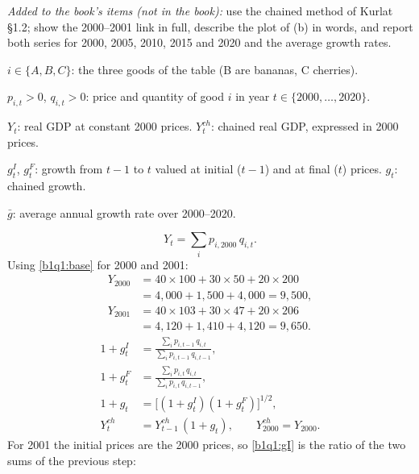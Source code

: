 \noindent\textit{Added to the book's items (not in the book):} use the chained method of Kurlat \S1.2; show the 2000--2001 link in full,
describe the plot of (b) in words, and report both series for 2000, 2005, 2010, 2015 and 2020 and the average growth rates.
\resolespaco
\begin{sol}
\begin{notacao}
\item $i\in\{A,B,C\}$: the three goods of the table (B are bananas, C cherries).
\item $p_{i,t}>0$, $q_{i,t}>0$: price and quantity of good $i$ in year $t\in\{2000,\dots,2020\}$.
\item $Y_t$: real GDP at constant 2000 prices. $Y^{ch}_t$: chained real GDP, expressed in 2000 prices.
\item $g^I_t$, $g^F_t$: growth from $t-1$ to $t$ valued at initial ($t-1$) and at final ($t$) prices. $g_t$: chained growth.
\item $\bar g$: average annual growth rate over 2000--2020.
\end{notacao}
\begin{equation}
Y_t=\textstyle\sum_i p_{i,2000}\,q_{i,t}. \label{b1q1:base}
\end{equation}
Using \eqref{b1q1:base} for 2000 and 2001:
\begin{align*}
Y_{2000}&=40\times100+30\times50+20\times200\\
&=4{,}000+1{,}500+4{,}000=9{,}500,\\
Y_{2001}&=40\times103+30\times47+20\times206\\
&=4{,}120+1{,}410+4{,}120=9{,}650.
\end{align*}
\begin{align}
1+g^I_t&=\frac{\sum_i p_{i,t-1}\,q_{i,t}}{\sum_i p_{i,t-1}\,q_{i,t-1}}, \label{b1q1:gI}\\
1+g^F_t&=\frac{\sum_i p_{i,t}\,q_{i,t}}{\sum_i p_{i,t}\,q_{i,t-1}}, \label{b1q1:gF}\\
1+g_t&=\big[(1+g^I_t)(1+g^F_t)\big]^{1/2}, \label{b1q1:g}\\
Y^{ch}_t&=Y^{ch}_{t-1}\,(1+g_t),\qquad Y^{ch}_{2000}=Y_{2000}. \label{b1q1:chain}
\end{align}
For 2001 the initial prices are the 2000 prices, so \eqref{b1q1:gI} is the ratio of the two sums of the previous step:

\end{sol}
